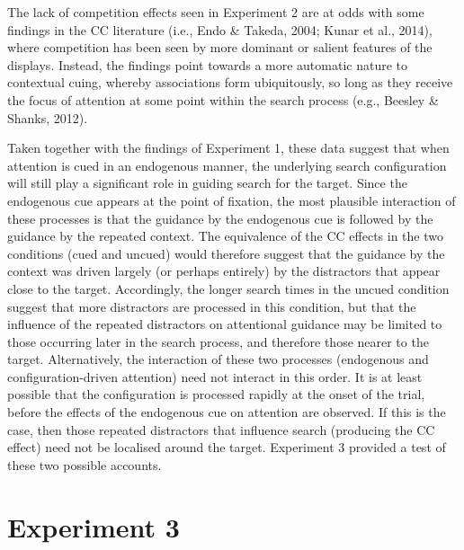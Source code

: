 \documentclass[
  man,floatsintext]{apa7}
\begin{document}
The lack of competition effects seen in Experiment 2 are at odds with some findings in the CC literature (i.e., Endo \& Takeda, 2004; Kunar et al., 2014), where competition has been seen by more dominant or salient features of the displays. Instead, the findings point towards a more automatic nature to contextual cuing, whereby associations form ubiquitously, so long as they receive the focus of attention at some point within the search process (e.g., Beesley \& Shanks, 2012).

Taken together with the findings of Experiment 1, these data suggest that when attention is cued in an endogenous manner, the underlying search configuration will still play a significant role in guiding search for the target. Since the endogenous cue appears at the point of fixation, the most plausible interaction of these processes is that the guidance by the endogenous cue is followed by the guidance by the repeated context. The equivalence of the CC effects in the two conditions (cued and uncued) would therefore suggest that the guidance by the context was driven largely (or perhaps entirely) by the distractors that appear close to the target. Accordingly, the longer search times in the uncued condition suggest that more distractors are processed in this condition, but that the influence of the repeated distractors on attentional guidance may be limited to those occurring later in the search process, and therefore those nearer to the target. Alternatively, the interaction of these two processes (endogenous and configuration-driven attention) need not interact in this order. It is at least possible that the configuration is processed rapidly at the onset of the trial, before the effects of the endogenous cue on attention are observed. If this is the case, then those repeated distractors that influence search (producing the CC effect) need not be localised around the target. Experiment 3 provided a test of these two possible accounts.

\hypertarget{experiment-3}{%
\section{Experiment 3}\label{experiment-3}}
\end{document}
